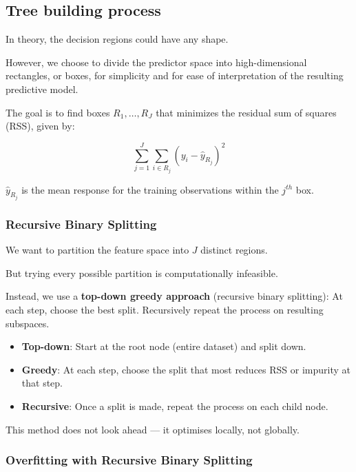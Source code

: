 \subsection{Tree building process}

\indent 

In theory, the decision regions could have any shape.

However, we choose to divide the predictor space into high-dimensional rectangles, or boxes, for simplicity and for ease of interpretation of the resulting predictive model.

The goal is to find boxes $R_1,\ldots,R_J$  that minimizes the residual sum of squares (RSS), given by:

\[
\sum_{j=1}^J \sum_{i\in R_j}(y_i - \hat{y}_{R_j})^2
\]

$\hat{y}_{R_j}$ is the mean response for the training observations within the $j^{th}$ box.

\subsubsection{Recursive Binary Splitting}

\indent 

We want to partition the feature space into $J$ distinct regions.

But trying every possible partition is computationally infeasible.

Instead, we use a \textbf{top-down greedy approach }(recursive binary splitting): At each step, choose the best split. Recursively repeat the process on resulting subspaces.

\begin{itemize}
    \item \textbf{Top-down}: Start at the root node (entire dataset) and split down.
    \item \textbf{Greedy}: At each step, choose the split that most reduces RSS or impurity at that step.
    \item \textbf{Recursive}: Once a split is made, repeat the process on each child node.
\end{itemize}

This method does not look ahead — it optimises locally, not globally.

\subsubsection{Overfitting with Recursive Binary Splitting}

